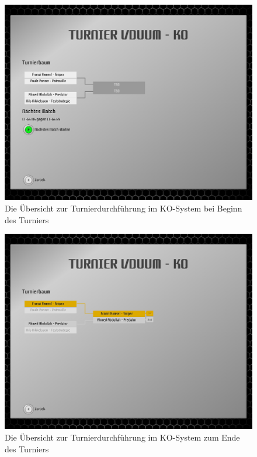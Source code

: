 \begin{figure}
  \centering
  \label{tournament-execution-ko-start}
  \includegraphics[width=15cm, keepaspectratio]{figures/16-turnierdurchfuehrung-ko-start.png}
  \caption{Die Übersicht zur Turnierdurchführung im KO-System bei Beginn des Turniers}
\end{figure}

\begin{figure}
  \centering
  \label{tournament-execution-ko-end}
  \includegraphics[width=15cm, keepaspectratio]{figures/16-turnierdurchfuehrung-ko-ende.png}
  \caption{Die Übersicht zur Turnierdurchführung im KO-System zum Ende des Turniers}
\end{figure}
